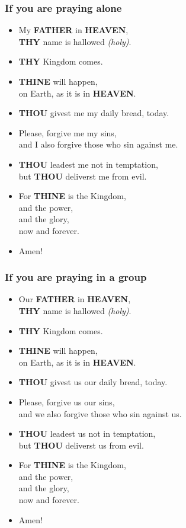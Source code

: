 \documentclass[12pt,a4paper]{article}
\newcommand{\Father}[0]{\textbf{FATHER}}
\newcommand{\Heaven}[0]{\textbf{HEAVEN}}
\newcommand{\Thine}[0]{\textbf{THINE}}
\newcommand{\Thou}[0]{\textbf{THOU}}
\newcommand{\Thy}[0]{\textbf{THY}}
\begin{document}
	\subsubsection{If you are praying alone}
		\begin{itemize}[nosep]
			\item	My {\Father} in {\Heaven},
					\\
					{\Thy} name is hallowed \textit{(holy)}.
			\item	{\Thy} Kingdom comes.
			\item	{{\Thine} will happen},
					\\
					on Earth,
					as it is in {\Heaven}.
			\item	{\Thou} givest me my daily bread,
					today.
			\item	Please,
					forgive me my sins,
					\\
					and I also forgive those who sin against me.
			\item	{\Thou} leadest me not in temptation,
					\\
					but {\Thou} deliverst me from evil.
			\item	For {\Thine} is the Kingdom,
					\\
					and the power,
					\\
					and the glory,
					\\
					now and forever.
			\item	Amen!
	\end{itemize}
	
	\subsubsection{If you are praying in a group}
		\begin{itemize}[nosep]
			\item	Our {\Father} in {\Heaven},
					\\
					{\Thy} name is hallowed \textit{(holy)}.
			\item	{\Thy} Kingdom comes.
			\item	{{\Thine} will happen},
					\\
					on Earth,
					as it is in {\Heaven}.
			\item	{\Thou} givest us our daily bread,
					today.
			\item	Please,
					forgive us our sins,
					\\
					and we also forgive those who sin against us.
			\item	{\Thou} leadest us not in temptation,
					\\
					but {\Thou} deliverst us from evil.
			\item	For {\Thine} is the Kingdom,
					\\
					and the power,
					\\
					and the glory,
					\\
					now and forever.
			\item	Amen!
		\end{itemize}
\end{document}
